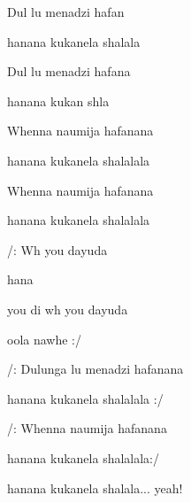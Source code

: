 

\zr

              
\kr

\zs
Dul lu menadzi hafan

hanana kukanela shalala

Dul lu menadzi hafana

hanana kukan shla
\ks


\zs
Whenna naumija hafanana

hanana kukanela shalalala

Whenna naumija hafanana

hanana kukanela shalalala
\ks

\zs
/:  Wh you dayuda

 hana

 you di wh you dayuda

 oola nawhe :/
\ks

\zr \kr

\zs
/: Dulunga lu menadzi hafanana

hanana kukanela shalalala :/

/: Whenna naumija hafanana

hanana kukanela shalalala:/
\ks

\zr \kr


hanana kukanela shalala... yeah!

\kp



